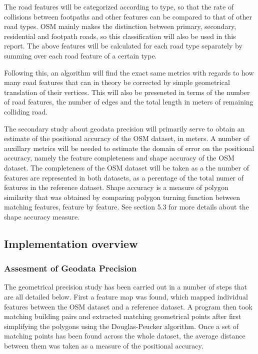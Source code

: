 \documentclass[a4paper]{article}
\begin{document}
The road features will be categorized according to type, so that the rate of collisions between footpaths and other features can be compared to that of other road types.
OSM mainly makes the distinction between primary, secondary, residential and footpath roads, so this classification will also be used in this report.
The above features will be calculated for each road type separately by summing over each road feature of a certain type.

Following this, an algorithm will find the exact same metrics with regards to how many road features that can in theory be corrected by simple geometrical translation of their vertices.
This will also be preseneted in terms of the number of road features, the number of edges and the total length in meters of remaining colliding road.

The secondary study about geodata precision will primarily serve to obtain an estimate of the positional accuracy of the OSM dataset, in meters.
A number of auxillary metrics will be needed to estimate the domain of error on the positional accuracy, namely the feature completeness and shape accuracy of the OSM dataset.
The completeness of the OSM dataset will be taken as a the number of features are represented in both datasets, as a perentage of the total numer of features in the reference dataset.
Shape accuracy is a measure of polygon similarity that was obtained by comparing polygon turning function between matching features, feature by feature.
See section 5.3 for more details about the shape accuracy measure.

\subsection{Implementation overview}

\subsubsection{Assesment of Geodata Precision}

The geometrical precision study has been carried out in a number of steps that are all detailed below.
First a feature map was found, which mapped individual features between the OSM dataset and a reference dataset.
A program then took matching building pairs and extracted matching geometrical points after first simplifying the polygons using the Douglas-Peucker algorithm.
Once a set of matching points has been found across the whole dataset, the average distance between them was taken as a measure of the positional accuracy.
\end{document}

